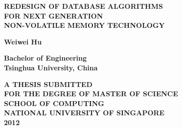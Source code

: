 \thispagestyle{empty}
\begin{center}

{\Large \bf REDESIGN OF DATABASE ALGORITHMS \\
            FOR NEXT GENERATION  \\
 \vspace{0.5cm} NON-VOLATILE MEMORY TECHNOLOGY }

\vspace{4.5cm}

{\large \bf Weiwei Hu} \\


\vspace{1cm}

{\large \bf Bachelor of Engineering  \\
Tsinghua University, China }

\vspace{4.0cm}

{\large \bf A THESIS SUBMITTED \\
FOR THE DEGREE OF MASTER OF SCIENCE \\
SCHOOL OF COMPUTING \\
NATIONAL UNIVERSITY OF SINGAPORE \\
\vspace{1.2cm} 2012 }

\end{center}
